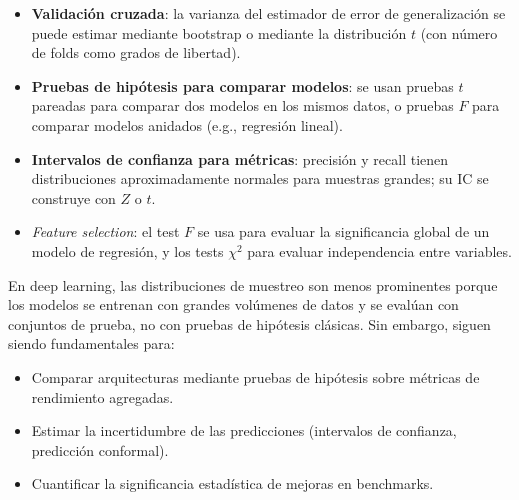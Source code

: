 \begin{itemize}
 \item \textbf{Validaci\'on cruzada}: la varianza del estimador de error de
 generalizaci\'on se puede estimar mediante bootstrap o mediante la distribuci\'on
 $t$ (con n\'umero de folds como grados de libertad).
 \item \textbf{Pruebas de hip\'otesis para comparar modelos}: se usan pruebas
 $t$ pareadas para comparar dos modelos en los mismos datos, o pruebas $F$ para
 comparar modelos anidados (e.g., regresi\'on lineal).
 \item \textbf{Intervalos de confianza para m\'etricas}: precisi\'on y recall
 tienen distribuciones aproximadamente normales para muestras grandes; su IC
 se construye con $Z$ o $t$.
 \item \emph{Feature selection}: el test $F$ se usa para evaluar la significancia
 global de un modelo de regresi\'on, y los tests $\chi^2$ para evaluar
 independencia entre variables.
\end{itemize}

\begin{observacion}
En deep learning, las distribuciones de muestreo son menos prominentes porque los
modelos se entrenan con grandes vol\'umenes de datos y se eval\'uan con conjuntos
de prueba, no con pruebas de hip\'otesis cl\'asicas. Sin embargo, siguen siendo
fundamentales para:
\begin{itemize}
 \item Comparar arquitecturas mediante pruebas de hip\'otesis sobre m\'etricas de
 rendimiento agregadas.
 \item Estimar la incertidumbre de las predicciones (intervalos de confianza,
 predicci\'on conformal).
 \item Cuantificar la significancia estad\'istica de mejoras en benchmarks.
\end{itemize}
\end{observacion}



